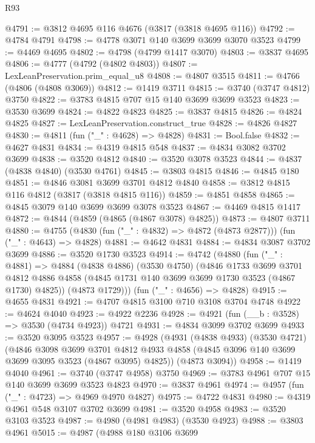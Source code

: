 \begin{lexlean}{R93}
\begin{coremodule}
@4791 := @3812 @4695 @116 @4676 (@3817 (@3818 @4695 @116))
@4792 := @4784 @4791
@4798 := @4778 @3071 @140 @3699 @3699 @3070 @3523
@4799 := @4469 @4695
@4802 := @4798 (@4799 @1417 @3070)
@4803 := @3837 @4695
@4806 := @4777 (@4792 (@4802 @4803))
@4807 := LexLeanPreservation.prim_equal_u8
@4808 := @4807 @3515
@4811 := @4766 (@4806 (@4808 @3069))
@4812 := @1419 @3711
@4815 := @3740 (@3747 @4812) @3750
@4822 := @3783 @4815 @707 @15 @140 @3699 @3699 @3523
@4823 := @3530 @3699
@4824 := @4822 @4823
@4825 := @3837 @4815
@4826 := @4824 @4825
@4827 := LexLeanPreservation.construct_true
@4828 := @4826 @4827
@4830 := @4811 (fun ("_" : @4628) => @4828)
@4831 := Bool.false
@4832 := @4627 @4831
@4834 := @4319 @4815 @548
@4837 := @4834 @3082 @3702 @3699
@4838 := @3520 @4812
@4840 := @3520 @3078 @3523
@4844 := @4837 (@4838 @4840) (@3530 @4761)
@4845 := @3803 @4815
@4846 := @4845 @180
@4851 := @4846 @3081 @3699 @3701 @4812 @4840
@4858 := @3812 @4815 @116 @4812 (@3817 (@3818 @4815 @116))
@4859 := @4851 @4858
@4865 := @4845 @3079 @140 @3699 @3699 @3078 @3523
@4867 := @4469 @4815 @1417
@4872 := @4844 (@4859 (@4865 (@4867 @3078) @4825))
@4873 := @4807 @3711
@4880 := @4755 (@4830 (fun ("_" : @4832) => @4872 (@4873 @2877))) (fun ("_" : @4643) => @4828)
@4881 := @4642 @4831
@4884 := @4834 @3087 @3702 @3699
@4886 := @3520 @1730 @3523
@4914 := @4742
    (@4880
      (fun ("_" : @4881) =>
      @4884
        (@4838 @4886)
        (@3530 @4750)
        (@4846
          @1733
          @3699
          @3701
          @4812
          @4886
          @4858
          (@4845 @1731 @140 @3699 @3699 @1730 @3523 (@4867 @1730) @4825))
        (@4873 @1729)))
    (fun ("_" : @4656) => @4828)
@4915 := @4655 @4831
@4921 := @4707 @4815 @3100 @710 @3108 @3704 @4748
@4922 := @4624 @4040
@4923 := @4922 @2236
@4928 := @4921 (fun (__b : @3528) => @3530 (@4734 @4923)) @4721
@4931 := @4834 @3099 @3702 @3699
@4933 := @3520 @3095 @3523
@4957 := @4928
    (@4931
      (@4838 @4933)
      (@3530 @4721)
      (@4846
        @3098
        @3699
        @3701
        @4812
        @4933
        @4858
        (@4845 @3096 @140 @3699 @3699 @3095 @3523 (@4867 @3095) @4825))
      (@4873 @3094))
@4958 := @1419 @4040
@4961 := @3740 (@3747 @4958) @3750
@4969 := @3783 @4961 @707 @15 @140 @3699 @3699 @3523 @4823
@4970 := @3837 @4961
@4974 := @4957 (fun ("_" : @4723) => @4969 @4970 @4827)
@4975 := @4722 @4831
@4980 := @4319 @4961 @548 @3107 @3702 @3699
@4981 := @3520 @4958
@4983 := @3520 @3103 @3523
@4987 := @4980 (@4981 @4983) (@3530 @4923)
@4988 := @3803 @4961
@5015 := @4987
    (@4988
      @180
      @3106
      @3699

\end{coremodule}
\end{lexlean}

